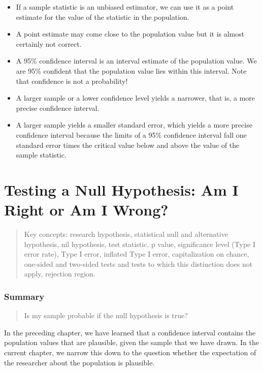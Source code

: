 \documentclass[a4paper]{book}
\theoremstyle{definition}
\theoremstyle{definition}
\theoremstyle{definition}
\theoremstyle{remark}
\begin{document}
\begin{itemize}
\item
  If a sample statistic is an unbiased estimator, we can use it as a
  point estimate for the value of the statistic in the population.
\item
  A point estimate may come close to the population value but it is
  almost certainly not correct.
\item
  A 95\% confidence interval is an interval estimate of the population
  value. We are 95\% confident that the population value lies within
  this interval. Note that confidence is not a probability!
\item
  A larger sample or a lower confidence level yields a narrower, that
  is, a more precise confidence interval.
\item
  A larger sample yields a smaller standard error, which yields a more
  precise confidence interval because the limits of a 95\% confidence
  interval fall one standard error times the critical value below and
  above the value of the sample statistic.
\end{itemize}

\chapter{Testing a Null Hypothesis: Am I Right or Am I
Wrong?}\label{hypothesis}

\begin{quote}
Key concepts: research hypothesis, statistical null and alternative
hypothesis, nil hypothesis, test statistic, p value, significance level
(Type I error rate), Type I error, inflated Type I error, capitalization
on chance, one-sided and two-sided tests and tests to which this
distinction does not apply, rejection region.
\end{quote}

\subsection*{Summary}\label{summary-3}

\begin{quote}
Is my sample probable if the null hypothesis is true?
\end{quote}

In the preceding chapter, we have learned that a confidence interval
contains the population values that are plausible, given the sample that
we have drawn. In the current chapter, we narrow this down to the
question whether the expectation of the researcher about the population
is plausible.
\end{document}
